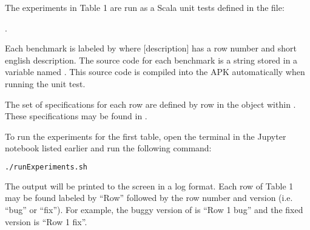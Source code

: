 \documentclass{acmart} %
\begin{document}
The experiments in Table 1 are run as a Scala unit tests defined in the file: 

.  

Each benchmark is labeled by  where [description] has a row number and short english description.
The source code for each benchmark is a string stored in a variable named .
This source code is compiled into the APK automatically when running the unit test.

The set of \newls specifications for each row are defined by row in the  object within .  These specifications may be found in .

To run the experiments for the first table, open the terminal in the Jupyter notebook listed earlier and run the following command:
\begin{lstlisting}[language=bash]
    ./runExperiments.sh
\end{lstlisting}

The output will be printed to the screen in a log format.  Each row of Table 1 may be found labeled by ``Row'' followed by the row number and version (i.e. ``bug'' or ``fix'').  For example, the buggy version of \apGa is ``Row 1 bug'' and the fixed version is ``Row 1 fix''.  

\newcommand{\cTimeout}{\showclock{0}{45}}
\newsavebox{\cSafeBox}
\newcommand{\cSafe}{
\usebox{\cSafeBox}
}

\newsavebox{\cSafeToFiveBox}
\newcommand{\cSafeToFive}{
\usebox{\cSafeToFiveBox}
}

\newsavebox{\cAlarmBox}
\newcommand{\cAlarm}{\usebox{\cAlarmBox}}
%
\end{document}
